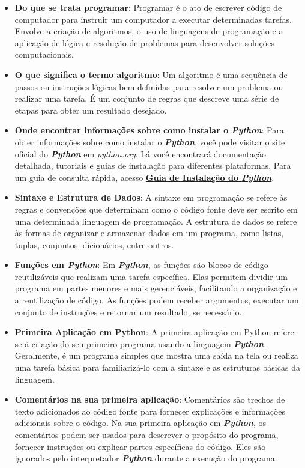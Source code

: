 \documentclass[a4paper, 12pt, onecolumn,singlespacing]{article}
\begin{document}
	\begin{itemize}
		
		\item \textbf{Do que se trata programar}: Programar é o ato de escrever código de computador para instruir um computador a executar determinadas tarefas. Envolve a criação de algoritmos, o uso de linguagens de programação e a aplicação de lógica e resolução de problemas para desenvolver soluções computacionais.
		
		\item \textbf{O que significa o termo algoritmo}: Um algoritmo é uma sequência de passos ou instruções lógicas bem definidas para resolver um problema ou realizar uma tarefa. É um conjunto de regras que descreve uma série de etapas para obter um resultado desejado.
		
		\item \textbf{Onde encontrar informações sobre como instalar o \textit{Python}}: Para obter informações sobre como instalar o \textbf{\textit{Python}}, você pode visitar o site oficial do \textbf{\textit{Python}} em \textit{python.org}. Lá você encontrará documentação detalhada, tutoriais e guias de instalação para diferentes plataformas. Para um guia de consulta rápida, acesso \href{Guia_Instalacao_Python.pdf}{\textbf{Guia de Instalação do \textit{\textbf{Python}}}}.
		
		\item \textbf{Sintaxe e Estrutura de Dados}: A sintaxe em programação se refere às regras e convenções que determinam como o código fonte deve ser escrito em uma determinada linguagem de programação. A estrutura de dados se refere às formas de organizar e armazenar dados em um programa, como listas, tuplas, conjuntos, dicionários, entre outros.
		
		\item \textbf{Funções em \textit{Python}}: Em \textbf{\textit{Python}}, as funções são blocos de código reutilizáveis que realizam uma tarefa específica. Elas permitem dividir um programa em partes menores e mais gerenciáveis, facilitando a organização e a reutilização de código. As funções podem receber argumentos, executar um conjunto de instruções e retornar um resultado, se necessário.
		
		\item \textbf{Primeira Aplicação em Python}: A primeira aplicação em Python refere-se à criação do seu primeiro programa usando a linguagem \textit{\textbf{Python}}. Geralmente, é um programa simples que mostra uma saída na tela ou realiza uma tarefa básica para familiarizá-lo com a sintaxe e as estruturas básicas da linguagem.
		
		\item \textbf{Comentários na sua primeira aplicação}: Comentários são trechos de texto adicionados ao código fonte para fornecer explicações e informações adicionais sobre o código. Na sua primeira aplicação em \textit{\textbf{Python}}, os comentários podem ser usados para descrever o propósito do programa, fornecer instruções ou explicar partes específicas do código. Eles são ignorados pelo interpretador \textbf{\textit{Python}} durante a execução do programa.
		
	\end{itemize}
	
\end{document}
